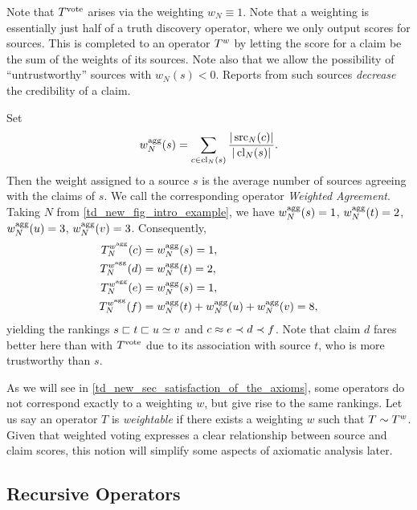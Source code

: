Note that $T^{\operatorname{vote}}$ arises via the weighting $w_N \equiv 1$. Note that a
weighting is essentially just half of a truth discovery operator, where we only
output scores for sources. This is completed to an operator $T^{w}$ by
letting the score for a claim be the sum of the weights of its sources. Note
also that we allow the possibility of ``untrustworthy'' sources with $w_N(s) <
0$.  Reports from such sources \emph{decrease} the credibility of a claim.

\begin{example}
    \label{td_new_ex_weighted_voting}
    Set
    \[
        w^{\operatorname{agg}}_N(s) = {
            \sum_{c \in \operatorname{cl}_N(s)}{
                \frac{|\operatorname{src}_N(c)|}{|\operatorname{cl}_N(s)|}
            }
        }.
    \]
    Then the weight assigned to a source $s$ is the average number of sources
    agreeing with the claims of $s$. We call the corresponding operator
    \emph{Weighted Agreement}. Taking $N$ from
    \cref{td_new_fig_intro_example}, we have $w^{\operatorname{agg}}_N(s) = 1$, $w^{\operatorname{agg}}_N(t) = 2$,
    $w^{\operatorname{agg}}_N(u) = 3$, $w^{\operatorname{agg}}_N(v) = 3$. Consequently,
    \begin{align*}
        T^{w^{\operatorname{agg}}}_N(c) &= w^{\operatorname{agg}}_N(s) = 1,\\
        T^{w^{\operatorname{agg}}}_N(d) &= w^{\operatorname{agg}}_N(t) = 2,\\
        T^{w^{\operatorname{agg}}}_N(e) &= w^{\operatorname{agg}}_N(s) = 1,\\
        T^{w^{\operatorname{agg}}}_N(f) &= w^{\operatorname{agg}}_N(t) + w^{\operatorname{agg}}_N(u) + w^{\operatorname{agg}}_N(v) = 8,
    \end{align*}
    yielding the rankings $s \sqsubset t \sqsubset u \simeq v$ and $c \approx e \prec d \prec
    f$. Note that claim $d$ fares better here than with $T^{\operatorname{vote}}$ due to its
    association with source $t$, who is more trustworthy than $s$.
\end{example}

As we will see in \cref{td_new_sec_satisfaction_of_the_axioms}, some operators do not correspond
exactly to a weighting $w$, but give rise to the same rankings. Let us say an
operator $T$ is \emph{weightable} if there exists a weighting $w$ such that $T
\sim T^{w}$. Given that weighted voting expresses a clear
relationship between source and claim scores, this notion will simplify
some aspects of axiomatic analysis later.

\subsection{Recursive Operators}
\label{td_new_sec_recursive_operators}

